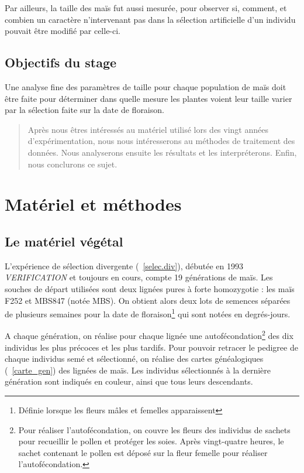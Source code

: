 \documentclass[12pt,a4paper]{report}
\begin{document}
				Par ailleurs, la taille des maïs fut aussi mesurée, pour observer si, comment, et combien un caractère n'intervenant pas dans la sélection artificielle d'un individu pouvait être modifié par celle-ci.
			
		\section{Objectifs du stage}
		
			Une analyse fine des paramètres de taille pour chaque population de maïs doit être faite pour déterminer dans quelle mesure les plantes voient leur taille varier par la sélection faite sur la date de floraison.
			
	\begin{quotation}
		Après nous êtres intéressés au matériel utilisé lors des vingt années d'expérimentation, nous nous intéresserons au méthodes de traitement des données. Nous analyserons ensuite les résultats et les interpréterons. Enfin, nous conclurons ce sujet.
	\end{quotation}
	
	
	\chapter{Matériel et méthodes}
		
		\section{Le matériel végétal}
			
			L'expérience de sélection divergente (~\ref{selec.div}), débutée en 1993 \textit{VERIFICATION} et toujours en cours, compte 19 générations de maïs. Les souches de départ utilisées sont deux lignées pures à forte homozygotie : les maïs F252 et MBS847 (notée MBS). On obtient alors deux lots de semences séparées de plusieurs semaines pour la date de floraison\footnote{Définie lorsque les fleurs mâles et femelles apparaissent} qui sont notées en degrés-jours.
			
			A chaque génération, on réalise pour chaque lignée une autofécondation\footnote{Pour réaliser l'autofécondation, on couvre les fleurs des individus de sachets pour recueillir le pollen et protéger les soies. Après vingt-quatre heures, le sachet contenant le pollen est déposé sur la fleur femelle pour réaliser l'autofécondation.} des dix individus les plus précoces et les plus tardifs. Pour pouvoir retracer le pedigree de chaque individus semé et sélectionné, on réalise des cartes généalogiques (~\ref{carte_gen}) des lignées de maïs. Les individus sélectionnés à la dernière génération sont indiqués en couleur, ainsi que tous leurs descendants. \cite{goossens93}
			
\end{document}
